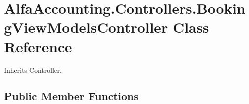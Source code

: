 \hypertarget{class_alfa_accounting_1_1_controllers_1_1_booking_view_models_controller}{}\section{Alfa\+Accounting.\+Controllers.\+Booking\+View\+Models\+Controller Class Reference}
\label{class_alfa_accounting_1_1_controllers_1_1_booking_view_models_controller}


 




Inherits Controller.

\subsection*{Public Member Functions}
